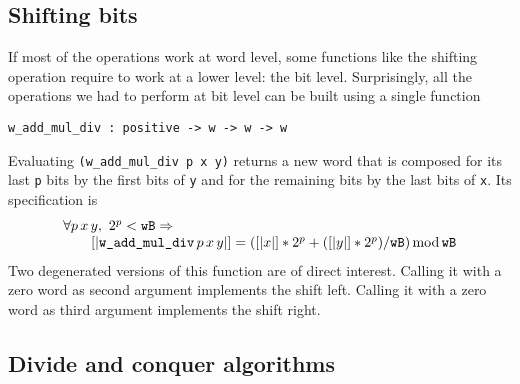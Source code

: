 \subsection{Shifting bits}

If most of the operations work at word level, some functions like the
shifting operation require to work at a lower level: the bit level.
Surprisingly, all the operations we had to perform at bit level can be built
using a single function
\begin{verbatim}
w_add_mul_div : positive -> w -> w -> w
\end{verbatim}
Evaluating  {\tt (w\_add\_mul\_div p x y)} returns a new word that
is composed for its last {\tt p} bits by the first bits of {\tt y}
and for the remaining bits by the last bits of {\tt x}.
Its specification is 
$$\begin{array}{l}
\forall p\, x\, y, \,\, 2 ^ p < {\texttt{wB}}  \Rightarrow \\
\hskip20pt [|\textit{\tt{w\_add\_mul\_div}}\, p\, x\, y|] = ([|x|] * 2 ^ p + ([|y|] * 2 ^ p) / {\texttt{wB}}) \,\mbox{mod}\, {\texttt{wB}}
\end{array}
$$
Two degenerated versions of this function are of direct interest. Calling it
with a zero word as second argument implements
the shift left. Calling it with a zero word as third argument implements
the shift right.

\subsection{Divide and conquer algorithms}

